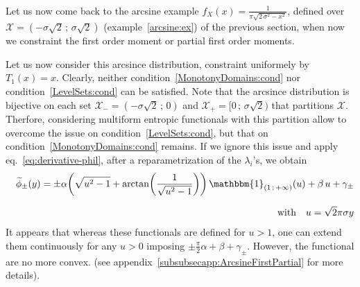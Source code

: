 \documentclass[entropy,article,submit,moreauthors,pdftex]{Definitions/mdpi}
\newcounter{arcsineExample}%
\newcommand{\SZ}[1]{{\color{blue} #1}}                                       %
\def\X{\mathcal{X}}%
\def\un{\mathbbm{1}}%
\begin{document}
\

Let us now  come back to the  arcsine example $f_X(x) =  \frac{1}{\pi \sqrt{2 \,
    \sigma^2 - x^2}}$, defined  over $\X = \left( -\sigma \sqrt2  \, ; \, \sigma
\sqrt2 \right)$ (example~\ref{arcsine:ex}) of the  previous section, when now we
constraint the first order moment or partial first order moments.

\setcounter{example}{0}
\renewcommand{\theexample}{\thearcsineExample-\arabic{example}}

\SZ{
\begin{Example}\label{arcsineUni:ex}
  Let  us now  consider  this arcsince  distribution,  constraint uniformely  by
  $T_1(x)  =  x$.   Clearly,  neither  condition~\ref{MonotonyDomains:cond}  nor
  condition~\ref{LevelSets:cond}  can  be  satisfied.  Note  that  the  arcsince
  distribution is bijective  on each set $\X_- =  ( - \sigma \sqrt2 \,  ; \, 0)$
  and  $\X_+ =  [0 \,  ;  \, \sigma  \sqrt2)$ that  partitions $\X$.   Therfore,
    considering  multiform entropic  functionals  with this  partition allow  to
    overcome   the  issue   on  condition~\ref{LevelSets:cond},   but  that   on
    condition~\ref{MonotonyDomains:cond} remains.
  If  we ignore  this issue  and apply  eq.~\eqref{eq:derivative-phil}, after  a
  reparametrization of the $\lambda_i$'s, we obtain
   \begin{eqnarray*}
   &&\widetilde{\phi}_\pm(y) = \pm \alpha  \left( \sqrt{u^2 -
    1} + \arctan\left( \frac{1}{\sqrt{u^2 - 1}} \right) \right)
  \, \un_{(  1 \, ;  \, +\infty )}(u)  + \beta \,  u +
  \gamma_\pm\\[2.5mm]
  && \mbox{with} \quad u = \sqrt2 \pi \sigma y
  \end{eqnarray*}
   It appears that  whereas these functionals are  defined for $u >  1$, one can
   extend them continuously for any $u > 0$ imposing $\pm \frac{\pi}{2} \alpha +
   \beta  + \gamma_\pm$.  However,  the  functional are  no  more convex.   (see
   appendix~\ref{subsubsecapp:ArcsineFirstPartial} for more details).
\end{Example}


}
\end{document}
